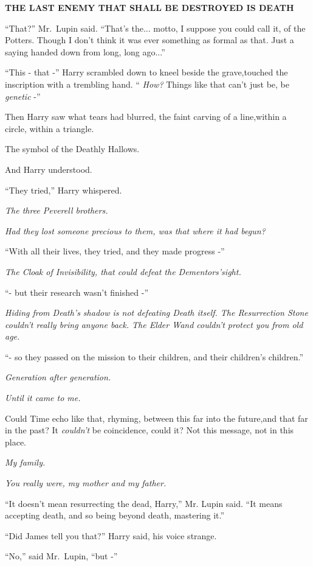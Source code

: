 \textbf{THE LAST ENEMY THAT SHALL BE DESTROYED IS DEATH}

“That?” Mr.~Lupin said. “That's the... motto, I suppose you could call it, of the Potters. Though I don't think it was ever something as formal as that. Just a saying handed down from long, long ago...”

“This - that -” Harry scrambled down to kneel beside the grave,touched the inscription with a trembling hand. “ \emph{How?} Things like that can't just be, be \emph{genetic} -”

Then Harry saw what tears had blurred, the faint carving of a line,within a circle, within a triangle.

The symbol of the Deathly Hallows.

And Harry understood.

“They tried,” Harry whispered.

\emph{The three Peverell brothers.}

\emph{Had they lost someone precious to them, was that where it had begun?}

“With all their lives, they tried, and they made progress -”

\emph{The Cloak of Invisibility, that could defeat the Dementors'sight.}

“- but their research wasn't finished -”

\emph{Hiding from Death's shadow is not defeating Death itself. The Resurrection Stone couldn't really bring anyone back. The Elder Wand couldn't protect you from old age.}

“- so they passed on the mission to their children, and their children's children.”

\emph{Generation after generation.}

\emph{Until it came to me.}

Could Time echo like that, rhyming, between this far into the future,and that far in the past? It \emph{couldn't} be coincidence, could it? Not this message, not in this place.

\emph{My family.}

\emph{You really were, my mother and my father.}

“It doesn't mean resurrecting the dead, Harry,” Mr. Lupin said. “It means accepting death, and so being beyond death, mastering it.”

“Did James tell you that?” Harry said, his voice strange.

“No,” said Mr.~Lupin, “but -”

